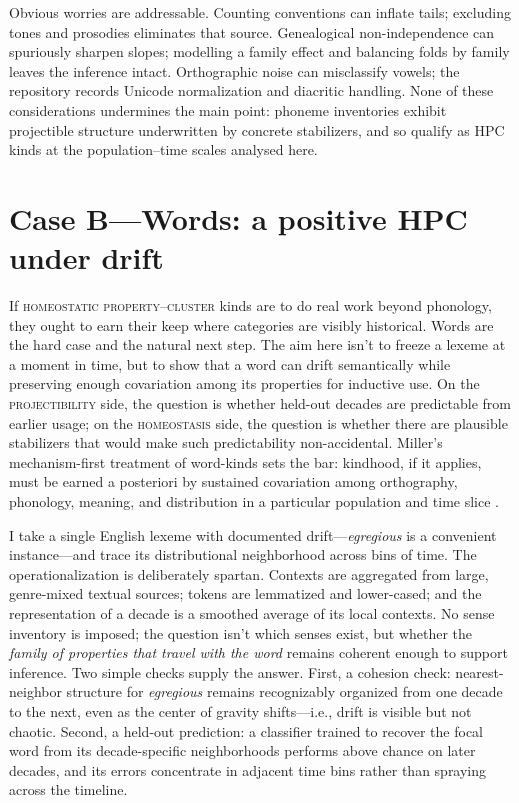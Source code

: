 \documentclass[12pt]{article}
\begin{document}
Obvious worries are addressable. Counting conventions can inflate tails; excluding tones and prosodies eliminates that source. Genealogical non-independence can spuriously sharpen slopes; modelling a family effect and balancing folds by family leaves the inference intact. Orthographic noise can misclassify vowels; the repository records Unicode normalization and diacritic handling. None of these considerations undermines the main point: phoneme inventories exhibit projectible structure underwritten by concrete stabilizers, and so qualify as \textsc{HPC} kinds at the population–time scales analysed here.

\section{Case B—Words: a positive HPC under drift}\label{sec:case-word}

If \textsc{homeostatic property–cluster} kinds are to do real work beyond phonology, they ought to earn their keep where categories are visibly historical. Words are the hard case and the natural next step. The aim here isn't to freeze a lexeme at a moment in time, but to show that a word can drift semantically while preserving enough covariation among its properties for inductive use. On the \textsc{projectibility} side, the question is whether held-out decades are predictable from earlier usage; on the \textsc{homeostasis} side, the question is whether there are plausible stabilizers that would make such predictability non-accidental. Miller’s mechanism-first treatment of word-kinds sets the bar: kindhood, if it applies, must be earned a posteriori by sustained covariation among orthography, phonology, meaning, and distribution in a particular population and time slice \citep{Miller2021WordsSpeciesKinds}.

I take a single English lexeme with documented drift—\emph{egregious} is a convenient instance—and trace its distributional neighborhood across bins of time. The operationalization is deliberately spartan. Contexts are aggregated from large, genre-mixed textual sources; tokens are lemmatized and lower-cased; and the representation of a decade is a smoothed average of its local contexts. No sense inventory is imposed; the question isn't which senses exist, but whether the \emph{family of properties that travel with the word} remains coherent enough to support inference. Two simple checks supply the answer. First, a cohesion check: nearest-neighbor structure for \emph{egregious} remains recognizably organized from one decade to the next, even as the center of gravity shifts—i.e., drift is visible but not chaotic. Second, a held-out prediction: a classifier trained to recover the focal word from its decade-specific neighborhoods performs above chance on later decades, and its errors concentrate in adjacent time bins rather than spraying across the timeline.
\end{document}
